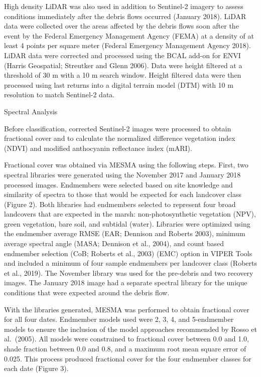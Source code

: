 \documentclass[
]{article}
\begin{document}
High density LiDAR was also used in addition to Sentinel-2 imagery to
assess conditions immediately after the debris flows occurred (January
2018). LiDAR data were collected over the areas affected by the debris
flows soon after the event by the Federal Emergency Management Agency
(FEMA) at a density of at least 4 points per square meter (Federal
Emergency Management Agency 2018). LiDAR data were corrected and
processed using the BCAL add-on for ENVI (Harris Geospatial; Streutker
and Glenn 2006). Data were height filtered at a threshold of 30 m with a
10 m search window. Height filtered data were then processed using last
returns into a digital terrain model (DTM) with 10 m resolution to match
Sentinel-2 data.

Spectral Analysis

Before classification, corrected Sentinel-2 images were processed to
obtain fractional cover and to calculate the normalized difference
vegetation index (NDVI) and modified anthocyanin reflectance index
(mARI).

Fractional cover was obtained via MESMA using the following steps.
First, two spectral libraries were generated using the November 2017 and
January 2018 processed images. Endmembers were selected based on site
knowledge and similarity of spectra to those that would be expected for
each landcover class (Figure 2). Both libraries had endmembers selected
to represent four broad landcovers that are expected in the marsh:
non-photosynthetic vegetation (NPV), green vegetation, bare soil, and
subtidal (water). Libraries were optimized using the endmember average
RMSE (EAR; Dennison and Roberts 2003), minimum average spectral angle
(MASA; Dennison et al., 2004), and count based endmember selection (CoB;
Roberts et al., 2003) (EMC) option in VIPER Tools and included a minimum
of four sample endmembers per landcover class (Roberts et al., 2019).
The November library was used for the pre-debris and two recovery
images. The January 2018 image had a separate spectral library for the
unique conditions that were expected around the debris flow.

With the libraries generated, MESMA was performed to obtain fractional
cover for all four dates. Endmember models used were 2, 3, 4, and
5-endmember models to ensure the inclusion of the model approaches
recommended by Rosso et al.~(2005). All models were constrained to
fractional cover between 0.0 and 1.0, shade fraction between 0.0 and
0.8, and a maximum root mean square error of 0.025. This process
produced fractional cover for the four endmember classes for each date
(Figure 3).
\end{document}
